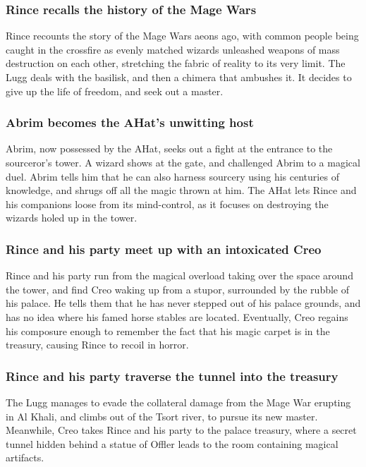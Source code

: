 \subsubsection{\Gls{Rince} recalls the history of the Mage Wars}
\Gls{Rince} recounts the story of the Mage Wars aeons ago, with common people being caught in the
crossfire as evenly matched wizards unleashed weapons of mass destruction on each other, stretching
the fabric of reality to its very limit. The \Gls{Lugg} deals with the basilisk, and then a chimera
that ambushes it. It decides to give up the life of freedom, and seek out a master.

\subsubsection{\Gls{Abrim} becomes the \Gls{AHat}'s unwitting host}
\Gls{Abrim}, now possessed by the \Gls{AHat}, seeks out a fight at the entrance to the sourceror's
tower. A wizard shows at the gate, and challenged \Gls{Abrim} to a magical duel. \Gls{Abrim} tells
him that he can also harness sourcery using his centuries of knowledge, and shrugs off all the
magic thrown at him. The \Gls{AHat} lets \Gls{Rince} and his companions loose from its mind-control,
as it focuses on destroying the wizards holed up in the tower.

\subsubsection{\Gls{Rince} and his party meet up with an intoxicated \Gls{Creo}}
\Gls{Rince} and his party run from the magical overload taking over the space around the tower,
and find \Gls{Creo} waking up from a stupor, surrounded by the rubble of his palace. He tells them
that he has never stepped out of his palace grounds, and has no idea where his famed horse stables
are located. Eventually, \Gls{Creo} regains his composure enough to remember the fact that his
magic carpet is in the treasury, causing \Gls{Rince} to recoil in horror.

\subsubsection{\Gls{Rince} and his party traverse the tunnel into the treasury}
The \Gls{Lugg} manages to evade the collateral damage from the Mage War erupting in Al Khali, and
climbs out of the Tsort river, to pursue its new master. Meanwhile, \Gls{Creo} takes \Gls{Rince}
and his party to the palace treasury, where a secret tunnel hidden behind a statue of \Gls{Offler}
leads to the room containing magical artifacts.

